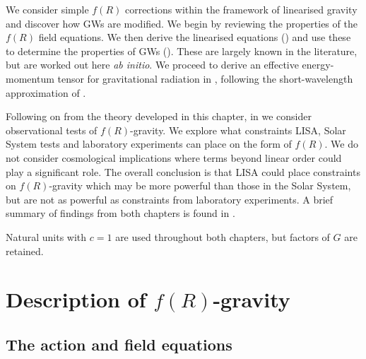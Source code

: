 We consider simple $f(R)$ corrections within the framework of linearised gravity and discover how GWs are modified. We begin by reviewing the properties of the $f(R)$ field equations. We then derive the linearised equations () and use these to determine the properties of GWs (). These are largely known in the literature, but are worked out here {\it ab initio}. We proceed to derive an effective energy-momentum tensor for gravitational radiation in , following the short-wavelength approximation of \citet{Isaacson1968, Isaacson1968a}.

Following on from the theory developed in this chapter, in  we consider observational tests of $f(R)$-gravity. We explore what constraints LISA, Solar System tests and laboratory experiments can place on the form of $f(R)$. We do not consider cosmological implications where terms beyond linear order could play a significant role. The overall conclusion is that LISA could place constraints on $f(R)$-gravity which may be more powerful than those in the Solar System, but are not as powerful as constraints from laboratory experiments. A brief summary of findings from both chapters is found in .

Natural units with $c = 1$ are used throughout both chapters, but factors of $G$ are retained.

\section{Description of $f(R)$-gravity}

\subsection{The action and field equations}\label{sec:Action}

